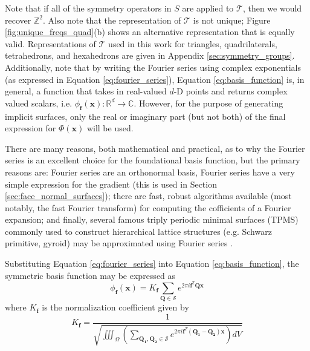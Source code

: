 \documentclass[acmtog]{acmart}
\begin{document}
%
Note that if all of the symmetry operators in $S$ are applied to $\mathcal{T}$, then we would recover $\mathbb{Z}^2$. Also note that the representation of $\mathcal{T}$ is not unique; Figure \ref{fig:unique_freqs_quad}(b) shows an alternative representation that is equally valid. Representations of $\mathcal{T}$ used in this work for triangles, quadrilaterals, tetrahedrons, and hexahedrons are given in Appendix \ref{sec:symmetry_groups}. Additionally, note that by writing the Fourier series using complex exponentials (as expressed in Equation \ref{eq:fourier_series}), Equation \ref{eq:basis_function} is, in general, a function that takes in real-valued $d$-D points and returns complex valued scalars, i.e. $\phi_{\mathbf{f}}(\mathbf{x}): \mathbb{R}^d \rightarrow \mathbb{C}$. However, for the purpose of generating implicit surfaces, only the real or imaginary part (but not both) of the final expression for $\Phi(\mathbf{x})$ will be used.

There are many reasons, both mathematical and practical, as to why the Fourier series is an excellent choice for the foundational basis function, but the primary reasons are: Fourier series are an orthonormal basis, Fourier series have a very simple expression for the gradient (this is used in Section \ref{sec:face_normal_surfaces}); there are fast, robust algorithms available (most notably, the fast Fourier transform) for computing the cofficients of a Fourier expansion; and finally, several famous triply periodic minimal surfaces (TPMS) commonly used to construct hierarchical lattice structures (e.g. Schwarz primitive, gyroid) may be approximated using Fourier series \cite{wohlgemuth2001triply}.

Substituting Equation \ref{eq:fourier_series} into Equation \ref{eq:basis_function}, the symmetric basis function may be expressed as
%
\begin{equation}
  \label{eq:basis_function_actual}
  \phi_{\mathbf{f}}(\mathbf{x}) = K_{\mathbf{f}} \sum\limits_{\mathbf{Q} \in \mathcal{S}} e^{2 \pi i \mathbf{f}^T \mathbf{Q} \mathbf{x}}
\end{equation}
%
where $K_{\mathbf{f}}$ is the normalization coefficient given by
%
\begin{equation}
  \label{eq:normalization_coeff}
  K_{\mathbf{f}} = \frac{1}{\sqrt{ \iiint_\Omega \left( \sum\limits_{\mathbf{Q_1}, \mathbf{Q_2} \in \mathcal{S}} e^{2 \pi i \mathbf{f}^T (\mathbf{Q_1 - Q_2}) \mathbf{x}} \right) dV }}
\end{equation}
%
\end{document}
